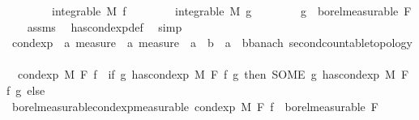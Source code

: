 \begin{isabellebody}
\ \ \ \ \ \ \ \ {\isachardoublequoteopen}integrable\ M\ f{\isachardoublequoteclose}\isanewline
\ \ \ \ \ \ \ \ {\isachardoublequoteopen}integrable\ M\ g{\isachardoublequoteclose}\isanewline
\ \ \ \ \ \ \ \ {\isachardoublequoteopen}g\ {\isasymin}\ borel{\isacharunderscore}{\kern0pt}measurable\ F{\isachardoublequoteclose}\isanewline
%
\isadelimproof
\ \ %
\endisadelimproof
%
\isatagproof
{}\isamarkupfalse%
\ assms\ \isamarkupfalse%
\ has{\isacharunderscore}{\kern0pt}cond{\isacharunderscore}{\kern0pt}exp{\isacharunderscore}{\kern0pt}def\ \isamarkupfalse%
\ simp{\isacharplus}{\kern0pt}%
\endisatagproof
{\isafoldproof}%
%
\isadelimproof
\isanewline
%
\endisadelimproof
\isanewline
{}\isamarkupfalse%
\ cond{\isacharunderscore}{\kern0pt}exp\ {\isacharcolon}{\kern0pt}{\isacharcolon}{\kern0pt}\ {\isachardoublequoteopen}{\isacharprime}{\kern0pt}a\ measure\ {\isasymRightarrow}\ {\isacharprime}{\kern0pt}a\ measure\ {\isasymRightarrow}\ {\isacharparenleft}{\kern0pt}{\isacharprime}{\kern0pt}a\ {\isasymRightarrow}\ {\isacharprime}{\kern0pt}b{\isacharparenright}{\kern0pt}\ {\isasymRightarrow}\ {\isacharparenleft}{\kern0pt}{\isacharprime}{\kern0pt}a\ {\isasymRightarrow}\ {\isacharprime}{\kern0pt}b{\isacharcolon}{\kern0pt}{\isacharcolon}{\kern0pt}{\isacharbraceleft}{\kern0pt}banach{\isacharcomma}{\kern0pt}\ second{\isacharunderscore}{\kern0pt}countable{\isacharunderscore}{\kern0pt}topology{\isacharbraceright}{\kern0pt}{\isacharparenright}{\kern0pt}{\isachardoublequoteclose}\ \isanewline
\ \ {\isachardoublequoteopen}cond{\isacharunderscore}{\kern0pt}exp\ M\ F\ f\ {\isacharequal}{\kern0pt}\ {\isacharparenleft}{\kern0pt}if\ {\isasymexists}g{\isachardot}{\kern0pt}\ has{\isacharunderscore}{\kern0pt}cond{\isacharunderscore}{\kern0pt}exp\ M\ F\ f\ g\ then\ {\isacharparenleft}{\kern0pt}SOME\ g{\isachardot}{\kern0pt}\ has{\isacharunderscore}{\kern0pt}cond{\isacharunderscore}{\kern0pt}exp\ M\ F\ f\ g{\isacharparenright}{\kern0pt}\ else\ {\isacharparenleft}{\kern0pt}{\isasymlambda}{\isacharunderscore}{\kern0pt}{\isachardot}{\kern0pt}\ {}{\isacharparenright}{\kern0pt}{\isacharparenright}{\kern0pt}{\isachardoublequoteclose}\isanewline
\isanewline
{}\isamarkupfalse%
\ borel{\isacharunderscore}{\kern0pt}measurable{\isacharunderscore}{\kern0pt}cond{\isacharunderscore}{\kern0pt}exp{\isacharbrackleft}{\kern0pt}measurable{\isacharbrackright}{\kern0pt}{\isacharcolon}{\kern0pt}\ {\isachardoublequoteopen}cond{\isacharunderscore}{\kern0pt}exp\ M\ F\ f\ {\isasymin}\ borel{\isacharunderscore}{\kern0pt}measurable\ F{\isachardoublequoteclose}\ \isanewline

\end{isabellebody}
